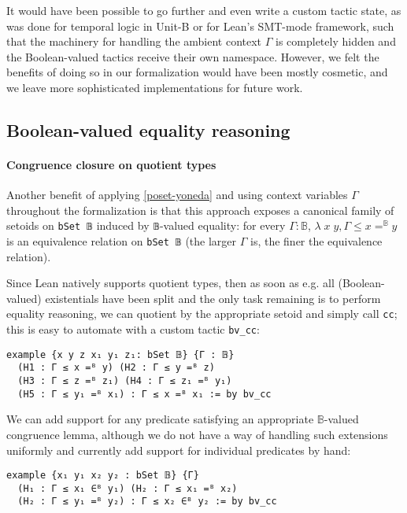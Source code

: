 \documentclass[sigplan,10pt,review, autoref,anonymous]{acmart}
\newcommand{\lil}{\lstinline}
\theoremstyle{definition}
\begin{document}
It would have been possible to go further and even write a custom tactic state, as was done for temporal logic in Unit-B \cite{Hudon2015TheUM} or for Lean's SMT-mode framework, such that the machinery for handling the ambient context \(\Gamma\) is completely hidden and the Boolean-valued tactics receive their own namespace. However, we felt the benefits of doing so in our formalization would have been mostly cosmetic, and we leave more sophisticated implementations for future work.

\subsection{Boolean-valued equality reasoning}

\paragraph{Congruence closure on quotient types} \label{subsect:bv-cc}
Another benefit of applying \autoref{poset-yoneda} and using context variables \(\Gamma\) throughout the formalization is that this approach exposes a canonical family of setoids on \lil{bSet 𝔹} induced by \lil{𝔹}-valued equality: for every \(\Gamma : \mathbb{B}\), \(\lambda\; x \; y, \Gamma \leq x =^{\mathbb{B}} y\) is an equivalence relation on \lil{bSet 𝔹} (the larger \(\Gamma\) is, the finer the equivalence relation).

Since Lean natively supports quotient types, then as soon as e.g. all (Boolean-valued) existentials have been split and the only task remaining is to perform equality reasoning, we can quotient by the appropriate setoid and simply call \lil{cc}; this is easy to automate with a custom tactic \lil{bv_cc}:

\begin{lstlisting}
example {x y z x₁ y₁ z₁: bSet 𝔹} {Γ : 𝔹}
  (H1 : Γ ≤ x =ᴮ y) (H2 : Γ ≤ y =ᴮ z)
  (H3 : Γ ≤ z =ᴮ z₁) (H4 : Γ ≤ z₁ =ᴮ y₁)
  (H5 : Γ ≤ y₁ =ᴮ x₁) : Γ ≤ x =ᴮ x₁ := by bv_cc
\end{lstlisting}

We can add support for any predicate satisfying an appropriate \(\mathbb{B}\)-valued congruence lemma, although we do not have a way of handling such extensions uniformly and currently add support for individual predicates by hand:

\begin{lstlisting}
example {x₁ y₁ x₂ y₂ : bSet 𝔹} {Γ}
  (H₁ : Γ ≤ x₁ ∈ᴮ y₁) (H₂ : Γ ≤ x₁ =ᴮ x₂)
  (H₂ : Γ ≤ y₁ =ᴮ y₂) : Γ ≤ x₂ ∈ᴮ y₂ := by bv_cc
\end{lstlisting}
\end{document}
